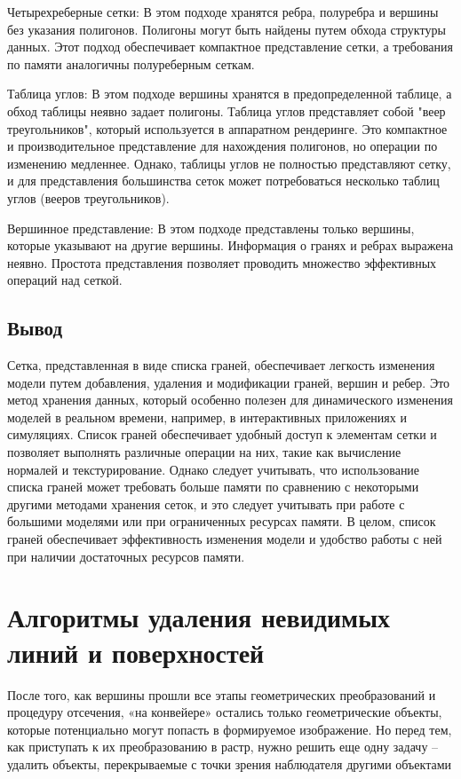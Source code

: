     Четырехреберные сетки: В этом подходе хранятся ребра, полуребра и вершины без указания полигонов. Полигоны могут быть найдены путем обхода структуры данных. Этот подход обеспечивает компактное представление сетки, а требования по памяти аналогичны полуреберным сеткам.

    Таблица углов: В этом подходе вершины хранятся в предопределенной таблице, а обход таблицы неявно задает полигоны. Таблица углов представляет собой "веер треугольников", который используется в аппаратном рендеринге. Это компактное и производительное представление для нахождения полигонов, но операции по изменению медленнее. Однако, таблицы углов не полностью представляют сетку, и для представления большинства сеток может потребоваться несколько таблиц углов (вееров треугольников).

    Вершинное представление: В этом подходе представлены только вершины, которые указывают на другие вершины. Информация о гранях и ребрах выражена неявно. Простота представления позволяет проводить множество эффективных операций над сеткой.



\subsection{Вывод}

Сетка, представленная в виде списка граней, обеспечивает легкость изменения модели путем добавления, удаления и модификации граней, вершин и ребер. Это метод хранения данных, который особенно полезен для динамического изменения моделей в реальном времени, например, в интерактивных приложениях и симуляциях. Список граней обеспечивает удобный доступ к элементам сетки и позволяет выполнять различные операции на них, такие как вычисление нормалей и текстурирование. Однако следует учитывать, что использование списка граней может требовать больше памяти по сравнению с некоторыми другими методами хранения сеток, и это следует учитывать при работе с большими моделями или при ограниченных ресурсах памяти. В целом, список граней обеспечивает эффективность изменения модели и удобство работы с ней при наличии достаточных ресурсов памяти.

\section{Алгоритмы удаления невидимых линий и поверхностей}

После того, как вершины прошли все этапы геометрических преобразований и процедуру
отсечения, «на конвейере» остались только геометрические объекты, которые потенциально могут
попасть в формируемое изображение. Но перед тем, как приступать к их преобразованию в растр,
нужно решить еще одну задачу – удалить объекты, перекрываемые с точки зрения наблюдателя
другими объектами 

